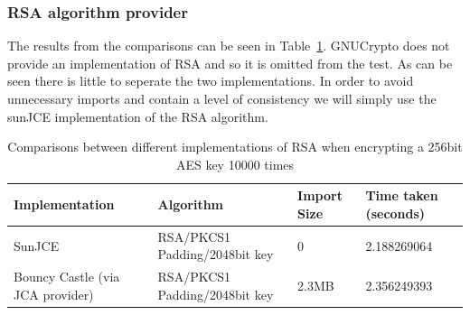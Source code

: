 \documentclass[12pt, titlepage]{article}
\begin{document}
\subsubsection{RSA algorithm provider}
The results from the comparisons can be seen in Table~\ref{tab:rsaComparison}. GNUCrypto does not provide an implementation of RSA and so it is omitted from the test. As can be seen there is little to seperate the two implementations. In order to avoid unnecessary imports and contain a level of consistency we will simply use the sunJCE implementation of the RSA algorithm.

\begin{center}
\begin{table}
    \begin{tabular}{ | l | l | l | l |}
    \hline
    Implementation & Algorithm & Import Size & Time taken (seconds) \\ \hline
    
    SunJCE & RSA/PKCS1 Padding/2048bit key & 0 & 2.188269064 \\ \hline
    
     Bouncy Castle (via JCA provider) & RSA/PKCS1 Padding/2048bit key & 2.3MB & 2.356249393 \\ \hline
    
    \end{tabular}
    \caption{Comparisons between different implementations of RSA when encrypting a 256bit AES key 10000 times} \label{tab:rsaComparison}
    \end{table}
\end{center}
\end{document}
